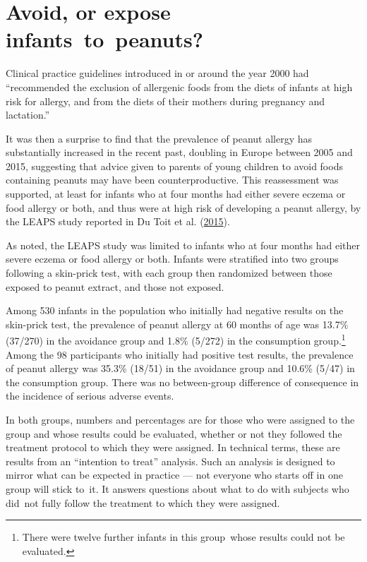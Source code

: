 \documentclass[
  10pt,
  b5paper]{book}
\begin{document}
\hypertarget{avoid-or-expose-infants-to-peanuts}{%
\section{Avoid, or expose infants~to~peanuts?}\label{avoid-or-expose-infants-to-peanuts}}

Clinical practice guidelines introduced in or around the year 2000 had
``recommended the exclusion of allergenic foods from the diets of infants
at high risk for allergy, and from the diets of their mothers during
pregnancy and lactation.''

It was then a surprise to find that the prevalence of peanut allergy has
substantially increased in the recent past, doubling in Europe between
2005 and 2015, suggesting that advice given to parents of young children
to avoid foods containing peanuts may have been counterproductive. This
reassessment was supported, at least for infants who at four months had
either severe eczema or food allergy or both, and thus were at high risk
of developing a peanut allergy, by the LEAPS study reported in
Du Toit et al. (\protect\hyperlink{ref-du2015randomized}{2015}).

As noted, the LEAPS study was limited to infants who at four months had
either severe eczema or food allergy or both. Infants were stratified
into two groups following a skin-prick test, with each group then
randomized between those exposed to peanut extract, and those not
exposed.

Among 530 infants in the population who initially had negative results
on the skin-prick test, the prevalence of peanut allergy at 60 months of
age was 13.7\% (37/270) in the avoidance group and 1.8\% (5/272) in the
consumption group.\footnote{There were twelve further infants in this group~whose
  results could not be evaluated.} Among the 98 participants who
initially had positive test results, the prevalence of peanut allergy
was 35.3\% (18/51) in the avoidance group and 10.6\% (5/47) in the
consumption group. There was no between-group difference of consequence
in the incidence of serious adverse events.

In both groups, numbers and percentages are for those who were assigned
to the group and whose results could be evaluated, whether or not they
followed the treatment protocol to which they were assigned. In
technical terms, these are results from an ``intention to treat''
analysis. Such an analysis is designed to mirror what can be expected in
practice --- not everyone who starts off in one group will stick to~it.
It answers questions about what to do with subjects who did~not fully
follow the treatment to which they were assigned.
\end{document}
